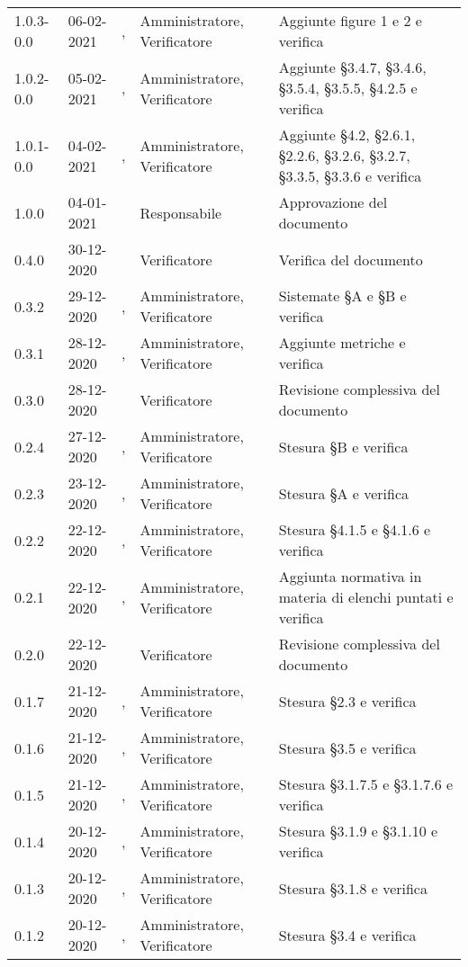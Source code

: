 {\begin{longtable}{C{1.7cm} | C{2.2cm} | C{3.2cm} | C{3cm} | C{4.8cm}}
1.0.3-0.0 & 06-02-2021 & \SH{}, \SP{} & Amministratore, Verificatore & Aggiunte figure 1 e 2 e verifica \\
1.0.2-0.0 & 05-02-2021 & \PA{}, \BM{} & Amministratore, Verificatore & Aggiunte \S 3.4.7, \S 3.4.6, \S 3.5.4, \S 3.5.5, \S 4.2.5 e verifica \\
1.0.1-0.0 & 04-02-2021 & \PA{}, \BM{} & Amministratore, Verificatore & Aggiunte \S 4.2, \S 2.6.1, \S 2.2.6, \S 3.2.6, \S 3.2.7, \S 3.3.5, \S 3.3.6 e verifica \\
1.0.0 & 04-01-2021 & \Approvatore{} & Responsabile & Approvazione del documento \\
0.4.0 & 30-12-2020 & \SG{} & Verificatore & Verifica del documento \\
0.3.2 & 29-12-2020 & \ZM{}, \SP{} & Amministratore, Verificatore & Sistemate \S A e \S B e verifica \\
0.3.1 & 28-12-2020 & \ZM{}, \SP{} & Amministratore, Verificatore & Aggiunte metriche e verifica \\
0.3.0 & 28-12-2020 & \SP{} & Verificatore & Revisione complessiva del documento\\
0.2.4 & 27-12-2020 & \PA{}, \SG{} & Amministratore, Verificatore & Stesura \S B e verifica\\
0.2.3 & 23-12-2020 & \PA{}, \BM{} & Amministratore, Verificatore & Stesura \S A e verifica\\
0.2.2 & 22-12-2020 & \SH{}, \BM{} & Amministratore, Verificatore & Stesura \S 4.1.5 e \S 4.1.6 e verifica\\
0.2.1 & 22-12-2020 & \PA{}, \SG{} & Amministratore, Verificatore & Aggiunta normativa in materia di elenchi puntati e verifica\\
0.2.0 & 22-12-2020 & \SG{} & Verificatore & Revisione complessiva del documento \\
0.1.7 & 21-12-2020 & \ZM{}, \SP{} & Amministratore, Verificatore & Stesura \S 2.3 e verifica \\
0.1.6 & 21-12-2020 & \RA{}, \BM{} & Amministratore, Verificatore & Stesura \S 3.5 e verifica \\
0.1.5 & 21-12-2020 & \PA{}, \BM{} & Amministratore, Verificatore & Stesura \S 3.1.7.5 e \S 3.1.7.6 e verifica \\
0.1.4 & 20-12-2020 & \ZM{}, \SP{} & Amministratore, Verificatore & Stesura \S 3.1.9 e \S 3.1.10 e verifica \\
0.1.3 & 20-12-2020 & \PA{}, \SP{} & Amministratore, Verificatore & Stesura \S 3.1.8 e verifica \\
0.1.2 & 20-12-2020 & \RA{}, \BM{} & Amministratore, Verificatore & Stesura \S 3.4 e verifica \\

\end{longtable}}
